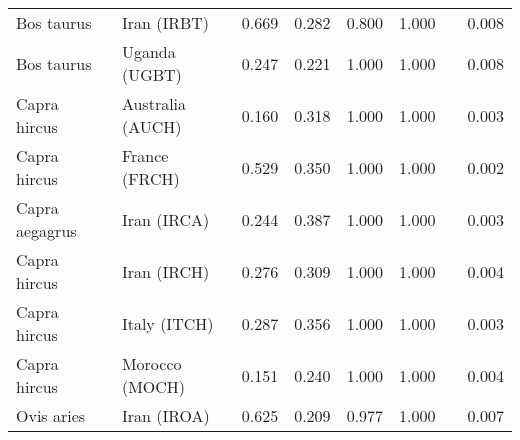 \begin{center}
\begin{adjustbox}{width = 1\textwidth}
\begin{tabular}{|l|l|r|r|r|r|r|}
          Bos taurus &                     Iran (IRBT) &                                              0.669 &                                              0.282 &                0.800 &                                  1.000~~ &              0.008 \\
          Bos taurus &                   Uganda (UGBT) &                                              0.247 &                                              0.221 &                1.000 &                                  1.000~~ &              0.008 \\
        Capra hircus &                Australia (AUCH) &                                              0.160 &                                              0.318 &                1.000 &                                  1.000~~ &              0.003 \\
        Capra hircus &                   France (FRCH) &                                              0.529 &                                              0.350 &                1.000 &                                  1.000~~ &              0.002 \\
      Capra aegagrus &                     Iran (IRCA) &                                              0.244 &                                              0.387 &                1.000 &                                  1.000~~ &              0.003 \\
        Capra hircus &                     Iran (IRCH) &                                              0.276 &                                              0.309 &                1.000 &                                  1.000~~ &              0.004 \\
        Capra hircus &                    Italy (ITCH) &                                              0.287 &                                              0.356 &                1.000 &                                  1.000~~ &              0.003 \\
        Capra hircus &                  Morocco (MOCH) &                                              0.151 &                                              0.240 &                1.000 &                                  1.000~~ &              0.004 \\
          Ovis aries &                     Iran (IROA) &                                              0.625 &                                              0.209 &                0.977 &                                  1.000~~ &              0.007 \\

\end{tabular}
\end{adjustbox}
\end{center}
